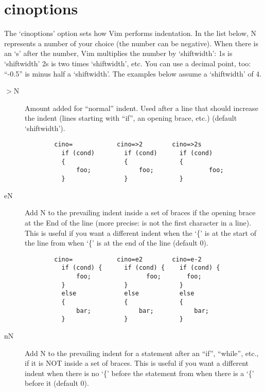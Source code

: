 \chapter{cinoptions}
\label{chap:cinoptions}

The `cinoptions' option sets how Vim performs indentation.  In the list below,
N represents a number of your choice (the number can be negative).  When
there is an `s' after the number, Vim multiplies the number by `shiftwidth':
1s is `shiftwidth' 2s is two times `shiftwidth', etc.  You can use a
decimal point, too: ``-0.5'' is minus half a `shiftwidth'.  The examples below
assume a `shiftwidth' of 4.

\begin{description}
    \item[$>$N] Amount added for ``normal'' indent.  Used after a line that should
          increase the indent (lines starting with ``if'', an opening brace,
          etc.) (default `shiftwidth').
\begin{verbatim}
        cino=            cino=>2        cino=>2s
          if (cond)        if (cond)      if (cond)
          {                {              {
              foo;             foo;               foo;
          }                }              }
\end{verbatim}
\clearpage
    \item[eN] Add N to the prevailing indent inside a set of braces if the
          opening brace at the End of the line (more precise: is not the
          first character in a line).  This is useful if you want a
          different indent when the `\{' is at the start of the line from
          when `\{' is at the end of the line  (default 0).
\begin{verbatim}
        cino=            cino=e2        cino=e-2
          if (cond) {      if (cond) {    if (cond) {
              foo;               foo;       foo;
          }                }              }
          else             else           else
          {                {              {
              bar;             bar;           bar;
          }                }              }
 \end{verbatim} 
    \item[nN] Add N to the prevailing indent for a statement after an ``if'',
          ``while'', etc., if it is NOT inside a set of braces.  This is
          useful if you want a different indent when there is no `\{'
          before the statement from when there is a `\{' before it
          (default 0).
\begin{verbatim}

\end{verbatim}
\end{description}
